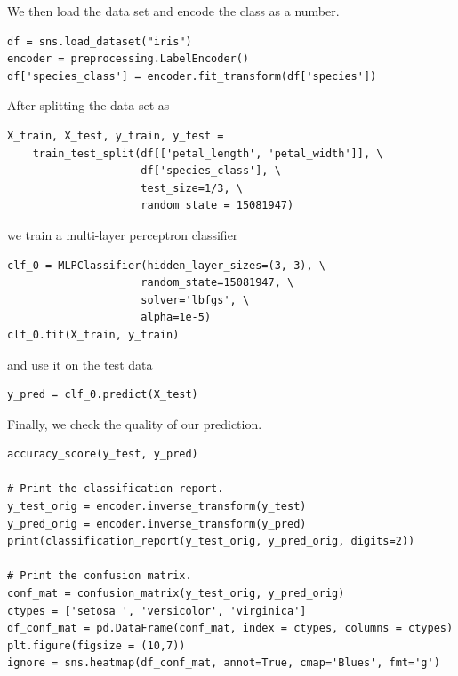 \documentclass[11pt]{article}
\numberwithin{equation}{section}
\begin{document}
We then load the data set and encode the class as a number.
\begin{verbatim}
df = sns.load_dataset("iris")
encoder = preprocessing.LabelEncoder()
df['species_class'] = encoder.fit_transform(df['species'])
\end{verbatim}

After splitting the data set as
\begin{verbatim}
X_train, X_test, y_train, y_test = 
	train_test_split(df[['petal_length', 'petal_width']], \
                     df['species_class'], \
                     test_size=1/3, \
                     random_state = 15081947)
\end{verbatim}
we train a multi-layer perceptron classifier 
\begin{verbatim}
clf_0 = MLPClassifier(hidden_layer_sizes=(3, 3), \
                     random_state=15081947, \
                     solver='lbfgs', \
                     alpha=1e-5)
clf_0.fit(X_train, y_train)
\end{verbatim}
and use it on the test data
\begin{verbatim}
y_pred = clf_0.predict(X_test)
\end{verbatim}
Finally, we check the quality of our prediction.
\begin{verbatim}
accuracy_score(y_test, y_pred)

# Print the classification report.
y_test_orig = encoder.inverse_transform(y_test)
y_pred_orig = encoder.inverse_transform(y_pred)
print(classification_report(y_test_orig, y_pred_orig, digits=2))

# Print the confusion matrix.
conf_mat = confusion_matrix(y_test_orig, y_pred_orig)
ctypes = ['setosa ', 'versicolor', 'virginica']
df_conf_mat = pd.DataFrame(conf_mat, index = ctypes, columns = ctypes)
plt.figure(figsize = (10,7))
ignore = sns.heatmap(df_conf_mat, annot=True, cmap='Blues', fmt='g')
\end{verbatim}
\end{document}
